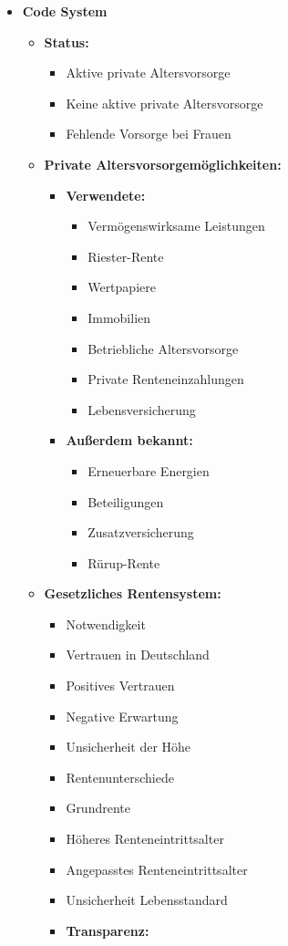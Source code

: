\documentclass{hsflensburg}
\begin{document}
	\begin{itemize}
	\item \textbf{Code System}
	\begin{itemize}

	\item \textbf{Status:}
	\begin{itemize}
	\item Aktive private Altersvorsorge
	\item Keine aktive private Altersvorsorge
	\item Fehlende Vorsorge bei Frauen
	\end{itemize}

	\item \textbf{Private Altersvorsorgemöglichkeiten:}
	\begin{itemize}
	\item \textbf{Verwendete:}

	\begin{itemize}
	\item Vermögenswirksame Leistungen
	\item Riester-Rente
	\item Wertpapiere
	\item Immobilien
	\item Betriebliche Altersvorsorge
	\item Private Renteneinzahlungen
	\item Lebensversicherung
	\end{itemize}

	\item \textbf{Außerdem bekannt:}
	\begin{itemize}
	\item Erneuerbare Energien
	\item Beteiligungen
	\item Zusatzversicherung
	\item Rürup-Rente
	\end{itemize}


	\end{itemize}

	\item \textbf{Gesetzliches Rentensystem:}
	\begin{itemize}
	\item Notwendigkeit
	\item Vertrauen in Deutschland
	\item Positives Vertrauen
	\item Negative Erwartung
	\item Unsicherheit der Höhe
	\item Rentenunterschiede
	\item Grundrente
	\item Höheres Renteneintrittsalter
	\item Angepasstes Renteneintrittsalter
	\item Unsicherheit Lebensstandard
	\item \textbf{Transparenz:}


\end{itemize}
\end{itemize}
\end{itemize}
\end{document}
